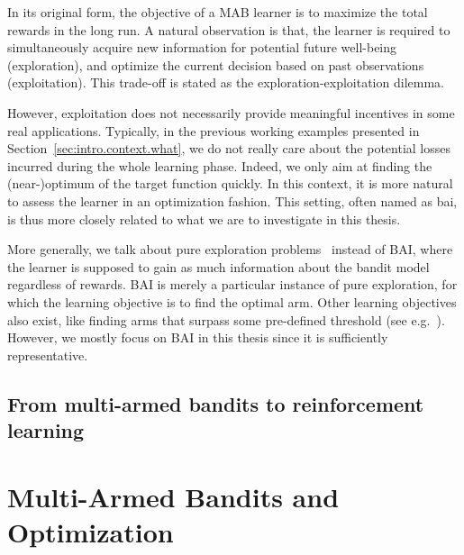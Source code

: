 In its original form, the objective of a MAB learner is to maximize the total rewards in the long run. A natural observation is that, the learner is required to simultaneously acquire new information for potential future well-being (exploration), and optimize the current decision based on past observations (exploitation). This trade-off is stated as the \gls{exploration-exploitation dilemma}. 

However, exploitation does not necessarily provide meaningful incentives in some real applications. Typically, in the previous working examples presented in Section~\ref{sec:intro.context.what}, we do not really care about the potential losses incurred during the whole learning phase. Indeed, we only aim at finding the (near-)optimum of the target function quickly. In this context, it is more natural to assess the learner in an optimization fashion. This setting, often named as \gls{bai}, is thus more closely related to what we are to investigate in this thesis.

\begin{remark}
\begin{leftbar}[remarkbar]
More generally, we talk about \gls{pure exploration} problems~\citep{bubeck2011pure} instead of BAI, where the learner is supposed to gain as much information about the bandit model regardless of rewards. BAI is merely a particular instance of pure exploration, for which the learning objective is to find the optimal arm. Other learning objectives also exist, like finding arms that surpass some pre-defined threshold (see e.g.~\citealt{locatelli2016thresholding}). However, we mostly focus on BAI in this thesis since it is sufficiently representative.
\end{leftbar}
\end{remark}

\subsection{From multi-armed bandits to reinforcement learning}\label{sec:intro.context.rl}

\section{Multi-Armed Bandits and Optimization}\label{sec:intro.mab}
    
